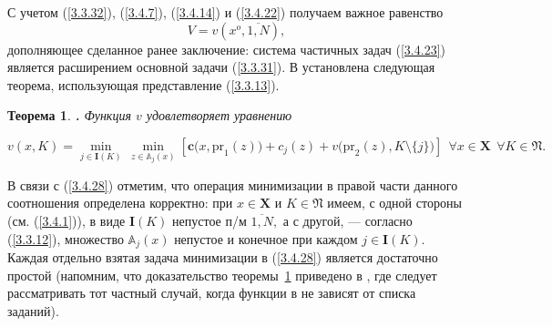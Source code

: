 \documentclass[11pt,twoside,openany]{report}
\newcommand{\bfn}{\begin{equation}}
\newcommand{\efn}{\end{equation}}
\newcommand{\ov}{\overline}
\newcounter{theo}
\newtheorem{theo}{Теорема}[section]
\newcommand{\TL}{\mbox{\bf{$\!\!$.}}}
\newcommand{\sm}{\setminus}
\newcommand{\fa}{\forall}
\newcommand{\bba}{{\mathbb A}}
\begin{document}
С учетом
(\ref{3.3.32}), (\ref{3.4.7}), (\ref{3.4.14}) и (\ref{3.4.22})
получаем важное равенство
\bfn
  \label{3.4.27}
  V = v(x^o,\ov{1,N})
  ,
\efn
дополняющее сделанное ранее заключение:
система частичных задач (\ref{3.4.23}) является
расширением основной задачи (\ref{3.3.31}).
В \cite{Cha3`} установлена следующая теорема,
использующая представление (\ref{3.3.13}).

\begin{theo}
  \label{t3.4.1}{\TL}
  Функция $v$ удовлетворяет уравнению

  \bfn
    \label{3.4.28}
      v(x,K) = \min\limits_{j\in \mathbf{I}(K)}\, \min\limits_{z\in \bba_j(x)}
      [\mathbf{c}\bigl(x,\mathrm{pr}_1(z)\bigl) + c_j(z) + v\bigl(\mathrm{pr}_2(z),
      K\sm\{j\}\bigl)]\ \ \fa x\in \mathbf{X}\ \ \fa K\in \mathfrak{N}.
    \efn
\end{theo}

В связи с (\ref{3.4.28}) отметим,
что операция минимизации в правой части данного
соотношения определена корректно:
при $x\in \mathbf{X}$ и $K\in \mathfrak{N}$ имеем,
с одной стороны (см. (\ref{3.4.1})),
в виде $\mathbf{I}(K)$ непустое п/м $\ov{1,N},$
а с другой, --- согласно  (\ref{3.3.12}),
множество $\bba_j(x)$ непустое и конечное при каждом
$j\in \mathbf{I}(K).$
Каждая отдельно взятая задача минимизации в (\ref{3.4.28})
является
достаточно простой
(напомним, что доказательство теоремы~\ref{t3.4.1}
приведено в \cite[теорема~5.1]{Cha3`},
где следует рассматривать
тот частный случай, когда функции в \cite[(4.1)]{Cha3`}
не зависят от списка заданий).
\end{document}
